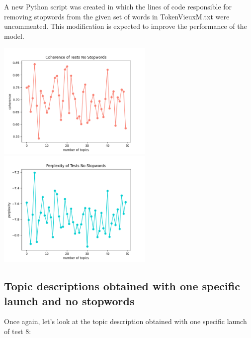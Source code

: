 \documentclass[10pt]{article} %
\begin{document}
	A new Python script was created in which the lines of code responsible for removing stopwords from the given set of words in TokenVieuxM.txt were uncommented. This modification is expected to improve the performance of the model. 
	
	\begin{center}
		\includegraphics[width=7.5cm]{images/coherence_no_stopwords}
		\includegraphics[width=7.5cm]{images/perplexity_no_stopwords}
	\end{center}
	
	
	\subsection{Topic descriptions obtained with one specific launch and no stopwords}\label{test_8_ns_1}
	
	Once again, let's look at the topic description obtained with one specific launch of test 8:
	
\end{document}
